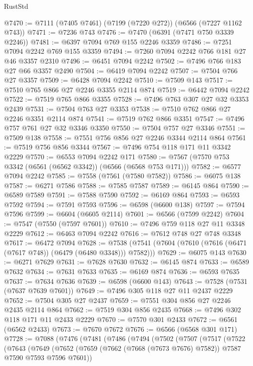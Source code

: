 \begin{lexlean}{RustStd}
\begin{coremodule}
{\begin{coremodule}
{{{{{{{{{{{{{{{{{{{{{{{{{{@7470 := @7111 (@7405 @7461) (@7199 (@7220 @272)) (@6566 (@7227 @1162 @743))
@7471 := @7236 @743
@7476 := @7470 (@6391 (@7471 @750 @3339 @2246))
@7481 := @6397 @7094 @769 @155 @2246 @3359
@7486 := @7251 @7094 @2242 @769 @155 @3359
@7494 := @7260 @7094 @2242 @766 @181 @27 @46 @3357 @2310
@7496 := @6451 @7094 @2242
@7502 := @7496 @766 @183 @27 @66 @3357 @2490
@7504 := @6419 @7094 @2242
@7507 := @7504 @766 @27 @3357
@7509 := @6428 @7094 @2242
@7510 := @7509 @143
@7517 := @7510 @765 @866 @27 @2246 @3355 @2114 @874
@7519 := @6442 @7094 @2242
@7522 := @7519 @765 @866 @3355
@7528 := @7496 @763 @307 @27 @32 @3353 @2439
@7531 := @7504 @763 @27 @3353
@7538 := @7510 @762 @866 @27 @2246 @3351 @2114 @874
@7541 := @7519 @762 @866 @3351
@7547 := @7496 @757 @761 @27 @32 @3346 @3350
@7550 := @7504 @757 @27 @3346
@7551 := @7509 @138
@7558 := @7551 @756 @856 @27 @2246 @3344 @2114 @864
@7561 := @7519 @756 @856 @3344
@7567 := @7496 @754 @118 @171 @11 @3342 @2229
@7570 := @6553 @7094 @2242 @171
@7580 := @7567 (@7570 @753 @3342 (@6561 (@6562 @3342)) (@6566 (@6568 @753 @171)))
@7582 := @6577 @7094 @2242
@7585 := @7558 (@7561 (@7580 @7582))
@7586 := @6075 @138
@7587 := @6271 @7586
@7588 := @7585 @7587
@7589 := @6145 @864
@7590 := @6589 @7589
@7591 := @7588 @7590
@7592 := @6169 @864
@7593 := @6593 @7592
@7594 := @7591 @7593
@7596 := @6598 (@6600 @138)
@7597 := @7594 @7596
@7599 := @6604 (@6605 @2114)
@7601 := @6566 (@7599 @2242)
@7604 := @7547 (@7550 (@7597 @7601))
@7610 := @7496 @759 @118 @27 @11 @3348 @2229
@7612 := @6463 @7094 @2242
@7616 := @7612 @748 @27 @748 @3348
@7617 := @6472 @7094
@7628 := @7538 (@7541 (@7604 (@7610 (@7616 (@6471 (@7617 @748)) (@6479 (@6480 @3348))) @7582)))
@7629 := @6075 @143
@7630 := @6271 @7629
@7631 := @7628 @7630
@7632 := @6145 @874
@7633 := @6589 @7632
@7634 := @7631 @7633
@7635 := @6169 @874
@7636 := @6593 @7635
@7637 := @7634 @7636
@7639 := @6598 (@6600 @143)
@7643 := @7528 (@7531 (@7637 @7639 @7601))
@7649 := @7496 @305 @118 @27 @11 @2437 @2229
@7652 := @7504 @305 @27 @2437
@7659 := @7551 @304 @856 @27 @2246 @2435 @2114 @864
@7662 := @7519 @304 @856 @2435
@7668 := @7496 @302 @118 @171 @11 @2433 @2229
@7670 := @7570 @301 @2433
@7672 := @6561 (@6562 @2433)
@7673 := @7670 @7672
@7676 := @6566 (@6568 @301 @171)
@7728 := @7088
    (@7476
      (@7481
        (@7486
          (@7494
            (@7502
              (@7507
                (@7517
                  (@7522
                    (@7643
                      (@7649
                        (@7652
                          (@7659 (@7662 (@7668 (@7673 @7676) @7582)) @7587 @7590 @7593 @7596 @7601))
}}}}}}}}}}}}}}}}}}}}}}}}}}
\end{coremodule}}
\end{coremodule}
\end{lexlean}

